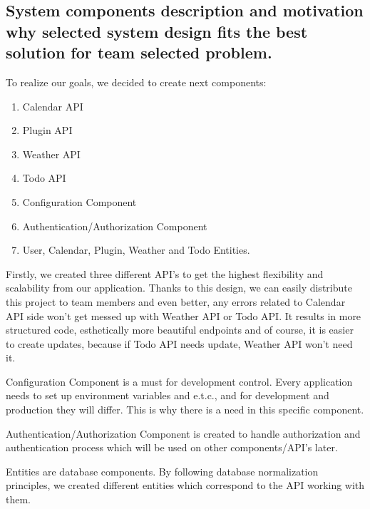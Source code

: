 \subsection {System components description and motivation why selected system design fits the best solution for team selected problem. }
\par To realize our goals, we decided to create next components: 
	\begin{enumerate}
		\item Calendar API
		\item Plugin API  
		\item Weather API  
		\item Todo API 
		\item Configuration Component 
		\item Authentication/Authorization Component 
		\item User, Calendar, Plugin, Weather and Todo Entities. 
	\end{enumerate}
\par Firstly, we created three different API’s to get the highest flexibility and scalability from our application. Thanks to this design, we can easily distribute this project to team members and even better, any errors related to Calendar API side won’t get messed up with Weather API or Todo API. It results in more structured code, esthetically more beautiful endpoints and of course, it is easier to create updates, because if Todo API needs update, Weather API won’t need it.  
\par Configuration Component is a must for development control. Every application needs to set up environment variables and e.t.c., and for development and production they will differ. This is why there is a need in this specific component. 
\par Authentication/Authorization Component is created to handle authorization and authentication process which will be used on other components/API’s later.  
\par Entities are database components. By following database normalization principles, we created different entities which correspond to the API working with them. 
